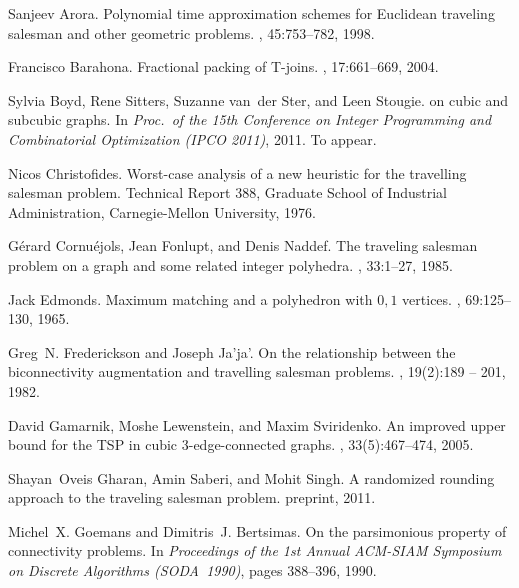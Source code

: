 \documentclass[letterpaper,11pt]{article}
\begin{document}
\begin{thebibliography}{10}

Sanjeev Arora.
\newblock Polynomial time approximation schemes for {E}uclidean traveling
  salesman and other geometric problems.
, 45:753--782, 1998.

Francisco Barahona.
\newblock Fractional packing of {T}-joins.
, 17:661--669, 2004.

Sylvia Boyd, Rene Sitters, Suzanne van~der Ster, and Leen Stougie.
 on cubic and subcubic graphs.
\newblock In {\em Proc.~of the 15th Conference on Integer Programming and
  Combinatorial Optimization (IPCO 2011)}, 2011.
\newblock To appear.

Nicos Christofides.
\newblock Worst-case analysis of a new heuristic for the travelling salesman
  problem.
\newblock Technical Report 388, Graduate School of Industrial Administration,
  Carnegie-Mellon University, 1976.

Gérard Cornuéjols, Jean Fonlupt, and Denis Naddef.
\newblock The traveling salesman problem on a graph and some related integer
  polyhedra.
, 33:1--27, 1985.

Jack Edmonds.
\newblock Maximum matching and a polyhedron with $0,1$ vertices.
,
  69:125--130, 1965.

Greg~N. Frederickson and Joseph Ja'ja'.
\newblock On the relationship between the biconnectivity augmentation and
  travelling salesman problems.
, 19(2):189 -- 201, 1982.

David Gamarnik, Moshe Lewenstein, and Maxim Sviridenko.
\newblock An improved upper bound for the {TSP} in cubic 3-edge-connected
  graphs.
, 33(5):467--474, 2005.

Shayan~Oveis Gharan, Amin Saberi, and Mohit Singh.
\newblock A randomized rounding approach to the traveling salesman problem.
\newblock preprint, 2011.

Michel~X. Goemans and Dimitris~J. Bertsimas.
\newblock On the parsimonious property of connectivity problems.
\newblock In {\em Proceedings of the 1st Annual ACM-SIAM Symposium on Discrete
  Algorithms (SODA~1990)}, pages 388--396, 1990.


\end{thebibliography}
\end{document}
